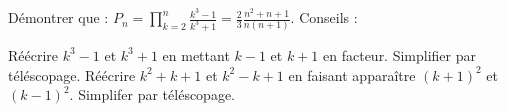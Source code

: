 %
%
	Démontrer que : $P_n =\prod\limits_{k=2}^n \frac{k^3-1}{k^3+1} = \frac{2}{3}\frac{n^2 +n +1}{n(n+1)}$.
	Conseils :
	\begin{tasks}
		\task Réécrire $k^3-1$ et $k^3+1$ en mettant $k-1$ et $k+1$ en facteur.
		\task Simplifier par téléscopage.
		\task Réécrire $k^2+k+1$  et $k^2-k+1$ en faisant apparaître $(k+1)^2$ et $(k-1)^2$.
		\task Simplifer par téléscopage.
	\end{tasks}
